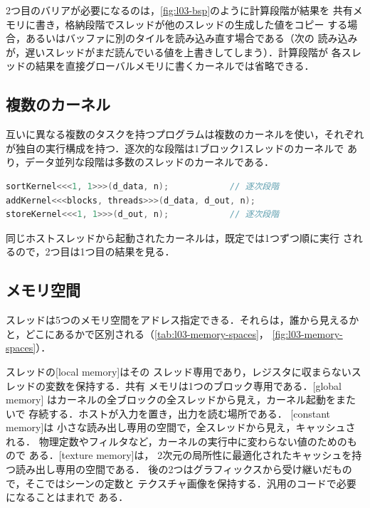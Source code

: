 \documentclass[../main.tex]{subfiles}
\begin{document}
2つ目のバリアが必要になるのは，\cref{fig:l03-bsp}のように計算段階が結果を
共有メモリに書き，格納段階でスレッドが他のスレッドの生成した値をコピー
する場合，あるいはバッファに別のタイルを読み込み直す場合である（次の
読み込みが，遅いスレッドがまだ読んでいる値を上書きしてしまう）．計算段階が
各スレッドの結果を直接グローバルメモリに書くカーネルでは省略できる．

\subsection{複数のカーネル}

互いに異なる複数のタスクを持つプログラムは複数のカーネルを使い，それぞれ
が独自の実行構成を持つ．逐次的な段階は1ブロック1スレッドのカーネルで
あり，データ並列な段階は多数のスレッドのカーネルである．
\begin{lstlisting}[language=C++, numbers=none]
sortKernel<<<1, 1>>>(d_data, n);            // 逐次段階
addKernel<<<blocks, threads>>>(d_data, d_out, n);
storeKernel<<<1, 1>>>(d_out, n);            // 逐次段階
\end{lstlisting}
同じホストスレッドから起動されたカーネルは，既定では1つずつ順に実行
されるので，2つ目は1つ目の結果を見る．

\subsection{メモリ空間}

スレッドは5つのメモリ空間をアドレス指定できる．それらは，誰から見えるか
と，どこにあるかで区別される（\cref{tab:l03-memory-spaces}，
\cref{fig:l03-memory-spaces}）．

\begin{definition}
  スレッドの[local memory]はその
  スレッド専用であり，レジスタに収まらないスレッドの変数を保持する．共有
  メモリは1つのブロック専用である．[global memory]
  はカーネルの全ブロックの全スレッドから見え，カーネル起動をまたいで
  存続する．ホストが入力を置き，出力を読む場所である．
  [constant memory]は
  小さな読み出し専用の空間で，全スレッドから見え，キャッシュされる．
  物理定数やフィルタなど，カーネルの実行中に変わらない値のためのもので
  ある．[texture memory]は，
  2次元の局所性に最適化されたキャッシュを持つ読み出し専用の空間である．
  後の2つはグラフィックスから受け継いだもので，そこではシーンの定数と
  テクスチャ画像を保持する．汎用のコードで必要になることはまれで
  ある．
\end{definition}
\end{document}
